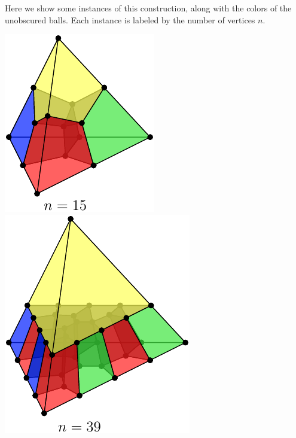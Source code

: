 Here we show some instances of this construction,
along with the colors of the unobscured balls.
Each instance is labeled by the number of vertices $n$.
\begin{center}
\includegraphics{pic-gcolor-1.pdf}\ \ \ \ \ \ \ \ \ \ \ 
\includegraphics{pic-gcolor-15.pdf}
\end{center}

